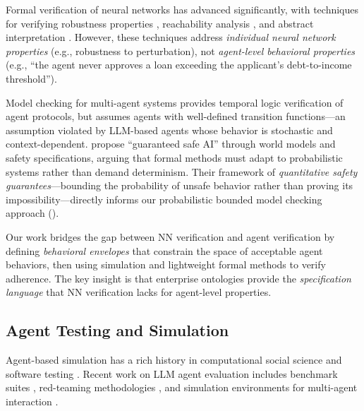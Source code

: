 \documentclass[11pt,a4paper]{article}
\begin{document}
Formal verification of neural networks has advanced significantly,
with techniques for verifying robustness properties
\citep{huang2020survey, katz2017reluplex}, reachability analysis
\citep{tran2020nnv}, and abstract interpretation
\citep{singh2019abstract}. However, these techniques address
\emph{individual neural network properties} (e.g., robustness to
perturbation), not \emph{agent-level behavioral properties} (e.g.,
``the agent never approves a loan exceeding the applicant's
debt-to-income threshold'').

Model checking for multi-agent systems \citep{lomuscio2017mcmas}
provides temporal logic verification of agent protocols, but assumes
agents with well-defined transition functions---an assumption violated
by LLM-based agents whose behavior is stochastic and context-dependent.
\citet{dalrymple2024guaranteed} propose ``guaranteed safe AI'' through
world models and safety specifications, arguing that formal methods
must adapt to probabilistic systems rather than demand determinism.
Their framework of \emph{quantitative safety guarantees}---bounding
the probability of unsafe behavior rather than proving its
impossibility---directly informs our probabilistic bounded model
checking approach ().

Our work bridges the gap between NN verification and agent
verification by defining \emph{behavioral envelopes} that constrain
the space of acceptable agent behaviors, then using simulation and
lightweight formal methods to verify adherence. The key insight is
that enterprise ontologies provide the \emph{specification language}
that NN verification lacks for agent-level properties.

\subsection{Agent Testing and Simulation}

Agent-based simulation has a rich history in computational social
science \citep{macal2010tutorial} and software testing
\citep{bertolino2007software}. Recent work on LLM agent evaluation
includes benchmark suites \citep{liu2023agentbench, shinn2023reflexion},
red-teaming methodologies \citep{perez2022red}, and simulation
environments for multi-agent interaction \citep{park2023generative}.
\end{document}
